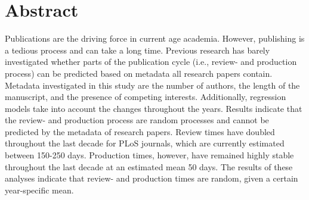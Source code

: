 \section*{Abstract}
Publications are the driving force in current age academia. However, publishing is a tedious process and can take a long time. Previous research has barely investigated whether parts of the publication cycle (i.e., review- and production process) can be predicted based on metadata all research papers contain. Metadata investigated in this study are the number of authors, the length of the manuscript, and the presence of competing interests. Additionally, regression models take into account the changes throughout the years. Results indicate that the review- and production process are random processes and cannot be predicted by the metadata of research papers. Review times have doubled throughout the last decade for PLoS journals, which are currently estimated between 150-250 days. Production times, however, have remained highly stable throughout the last decade at an estimated mean 50 days. The results of these analyses indicate that review- and production times are random, given a certain year-specific mean. 
  
  
  